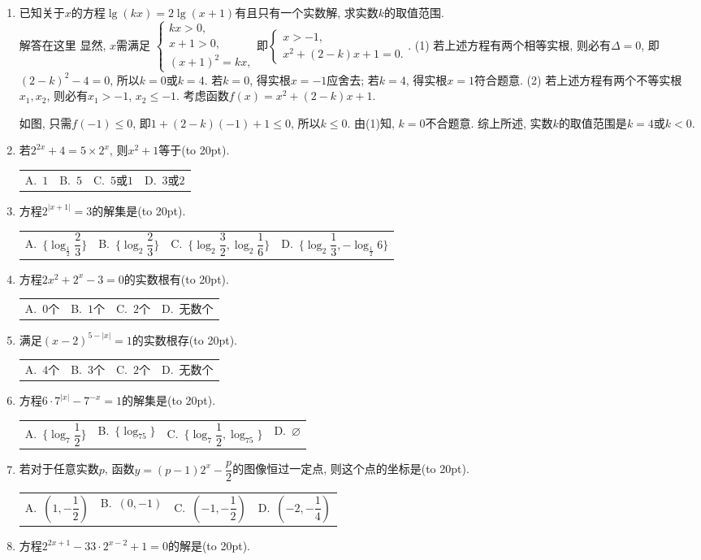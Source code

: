 \documentclass[10pt,a4paper]{article}
\newcommand{\bracket}[1]{(\hbox to #1pt{})}
\newcommand{\fourch}[4]{\par\begin{tabular}{p{.23\textwidth}p{.23\textwidth}p{.23\textwidth}p{.23\textwidth}}
A.~#1 &B.~#2& C.~#3& D.~#4
\end{tabular}}
\begin{document}
\begin{enumerate}[1.]
\item 已知关于$x$的方程$\lg (kx)=2\lg (x+1)$有且只有一个实数解, 求实数$k$的取值范围.\\
解答在这里  显然, $x$需满足
$\begin{cases} kx>0, \\ x+1>0, \\ (x+1)^2=kx, \end{cases}$即$\begin{cases} x>-1, \\ x^2+(2-k)x+1=0. \end{cases}$.
(1) 若上述方程有两个相等实根, 则必有$\Delta =0$, 即$(2-k)^2-4=0$,
所以$ k=0$或$k=4$.
若$k=0$, 得实根$x=-1$应舍去; 若$k=4$, 得实根$x=1$符合题意.
(2) 若上述方程有两个不等实根$x_1,x_2$,
则必有$x_1>-1$, $x_2\le -1$.
考虑函数$f(x)=x^2+(2-k)x+1$.
\begin{center}
\end{center}
如图, 只需$f(-1)\le 0$, 即$1+(2-k)(-1)+1\le 0$,
所以$ k\le 0$. 由(1)知, $k=0$不合题意.
综上所述, 实数$k$的取值范围是$k=4$或$k<0$.
\item 若$2^{2x}+4=5\times 2^x$, 则$x^2+1$等于\bracket{20}.
\fourch{$1$}{$5$}{$5$或$1$}{$3$或$2$}
\item 方程$2^{|x+1|}=3$的解集是\bracket{20}.
\fourch{$\{\log_{\frac 12}\dfrac 23\}$}{$\{\log_2\dfrac 23\}$}{$\{\log_2\dfrac 32,\log_2\dfrac 16\}$}{$\{\log_2\dfrac 13,-\log_{\frac 12}6\}$}
\item 方程$2x^2+2^x-3=0$的实数根有\bracket{20}.
\fourch{$0$个}{$1$个}{$2$个}{无数个}
\item 满足$(x-2)^{5-|x|}=1$的实数根存\bracket{20}.
\fourch{$4$个}{$3$个}{$2$个}{无数个}
\item 方程$6\cdot 7^{|x|}-7^{-x}=1$的解集是\bracket{20}.
\fourch{$\{\log_7\dfrac 12\}$}{$\{\log_75\}$}{$\{\log_7\dfrac 12,\log_75\}$}{$\varnothing$}
\item 若对于任意实数$p$, 函数$y=(p-1)2^x-\dfrac p2$的图像恒过一定点, 则这个点的坐标是\bracket{20}.
\fourch{$(1,-\dfrac 12)$}{$(0, -1)$}{$(-1,-\dfrac 12)$}{$(-2,-\dfrac 14)$}
\item 方程$2^{2x+1}-33\cdot 2^{x-2}+1=0$的解是\bracket{20}.

\end{enumerate}
\end{document}
